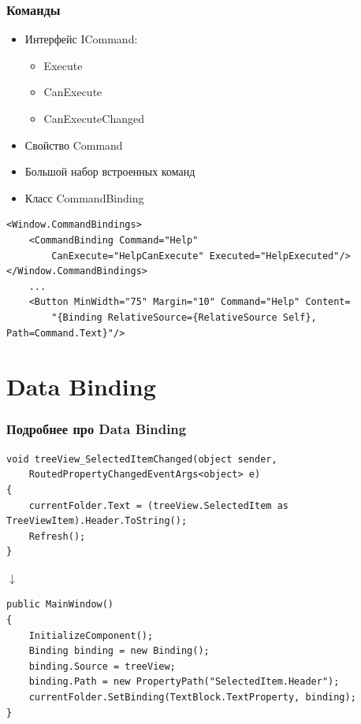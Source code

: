 \documentclass[xetex,mathserif,serif]{beamer}
\newcommand{\DownArrow} {
	\hspace{2cm}\begin{LARGE}$\downarrow$\end{LARGE}
}
\begin{document}
	\begin{frame}[fragile]
		\frametitle{Команды}
		\begin{itemize}
			\item Интерфейс ICommand:
			\begin{itemize}
				\item Execute
				\item CanExecute
				\item CanExecuteChanged
			\end{itemize}
			\item Свойство Command
			\item Большой набор встроенных команд
			\item Класс CommandBinding
		\end{itemize}
		\begin{small}
			\begin{verbatim}
<Window.CommandBindings>
    <CommandBinding Command="Help"
        CanExecute="HelpCanExecute" Executed="HelpExecuted"/>
</Window.CommandBindings>
    ...
    <Button MinWidth="75" Margin="10" Command="Help" Content=
        "{Binding RelativeSource={RelativeSource Self}, Path=Command.Text}"/>
			\end{verbatim}
		\end{small}
	\end{frame}

	\section{Data Binding}

	\begin{frame}[fragile]
		\frametitle{Подробнее про Data Binding}
		\begin{footnotesize}
			\begin{verbatim}
void treeView_SelectedItemChanged(object sender,
    RoutedPropertyChangedEventArgs<object> e)
{
    currentFolder.Text = (treeView.SelectedItem as TreeViewItem).Header.ToString();
    Refresh();
}
			\end{verbatim}
		\end{footnotesize}
		\DownArrow
		\begin{footnotesize}
			\begin{verbatim}
public MainWindow()
{
    InitializeComponent();
    Binding binding = new Binding();
    binding.Source = treeView;
    binding.Path = new PropertyPath("SelectedItem.Header");
    currentFolder.SetBinding(TextBlock.TextProperty, binding);
}
			\end{verbatim}
		\end{footnotesize}
	\end{frame}
\end{document}
